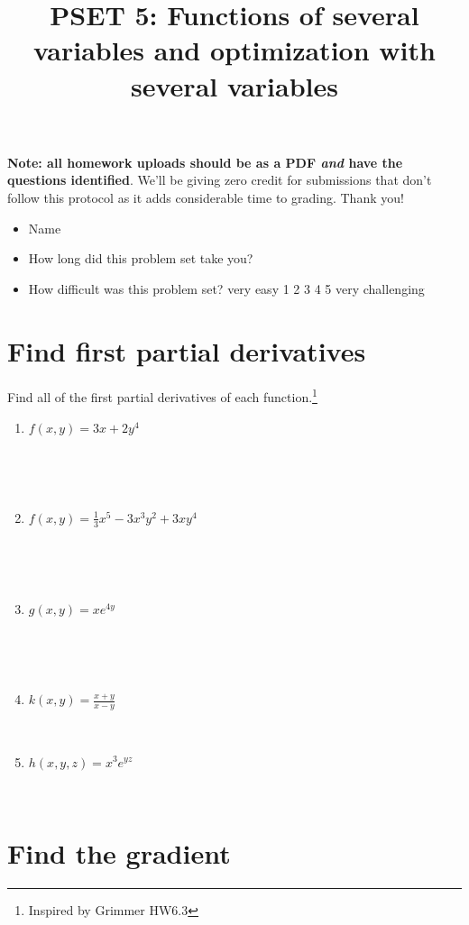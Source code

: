 \documentclass[
]{article}
\title{PSET 5: Functions of several variables and optimization with
several variables}
\author{}
\date{\vspace{-2.5em}}
\begin{document}
\maketitle

\textbf{Note: all homework uploads should be as a PDF \emph{and} have
the questions identified}. We'll be giving zero credit for submissions
that don't follow this protocol as it adds considerable time to grading.
Thank you!

\begin{itemize}
\item
  Name
\item
  How long did this problem set take you?
\item
  How difficult was this problem set? very easy 1 2 3 4 5 very
  challenging
\end{itemize}

\section{Find first partial
derivatives}\label{find-first-partial-derivatives}

Find all of the first partial derivatives of each function.\footnote{Inspired
  by Grimmer HW6.3}

\begin{enumerate}
\def\labelenumi{\alph{enumi}.}
\item
  \(f(x,y) = 3x + 2y^4\)

  ~ ~\\
  \strut \\
\item
  \(f(x,y) = \frac{1}{3}x^5 - 3x^3y^2 + 3xy^4\)

  ~ ~\\
  \strut \\
\item
  \(g(x,y) = xe^{4y}\)

  ~ ~\\
  \strut \\
\item
  \(k(x,y) = \frac{x+y}{x-y}\)

  ~\\
\item
  \(h(x,y,z) = x^3 e^{yz}\)

  ~\\
  \newpage
\end{enumerate}

\section{Find the gradient}\label{find-the-gradient}
\end{document}
